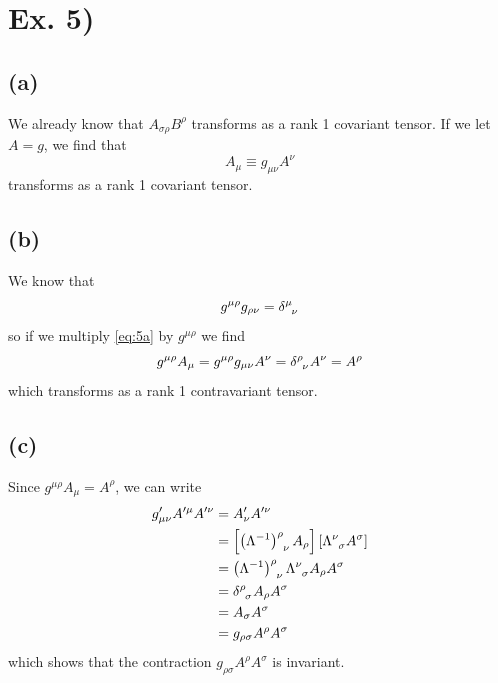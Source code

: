 \documentclass[oneside, 10pt, notitlepage]{book}
\begin{document}
\section*{Ex. 5)}

\subsection*{(a)}

We already know that \(A_{\sigma \rho}B^{\rho}\) transforms as a rank 1 covariant tensor. If we let \(A=g\), we find that
\begin{equation}\label{eq:5a}
    A_{\mu}\equiv g_{\mu\nu}A^{\nu}
\end{equation}
transforms as a rank 1 covariant tensor.

\subsection*{(b)}
We know that
\begin{equation}
    g^{\mu \rho}g_{\rho \nu} = \tensor{\delta}{^{\mu}_{\nu}}
\end{equation}
so if we multiply \eqref{eq:5a} by \(g^{\mu\rho}\) we find
\begin{equation}
    g^{\mu\rho} A_{\mu} = g^{\mu\rho}g_{\mu\nu}A^{\nu} = \tensor{\delta}{^{\rho}_{\nu}}A^{\nu} = A^{\rho}
\end{equation}
which transforms as a rank 1 contravariant tensor.

\subsection*{(c)}

Since \(g^{\mu\rho}A_{\mu}=A^{\rho}\), we can write
\begin{equation}
\begin{split}
    g'_{\mu\nu}A'^{\mu}A'^{\nu} &= A'_{\nu}A'^{\nu} \\
    &= \ssb{\tensor{\lr{\Lambda^{-1}}}{^{\rho}_{\nu}}A_{\rho}}\ssb{ \tensor{\Lambda}{^{\nu}_{\sigma}}A^{\sigma}} \\
    &= \tensor{\lr{\Lambda^{-1}}}{^{\rho}_{\nu}}\tensor{\Lambda}{^{\nu}_{\sigma}}A_{\rho}A^{\sigma} \\
    &= \tensor{\delta}{^{\rho}_{\sigma}}A_{\rho}A^{\sigma} \\
    &= A_{\sigma}A^{\sigma} \\
    &= g_{\rho \sigma} A^{\rho}A^{\sigma}
\end{split}
\end{equation}
which shows that the contraction \(g_{\rho \sigma} A^{\rho}A^{\sigma}\) is invariant.
\end{document}
